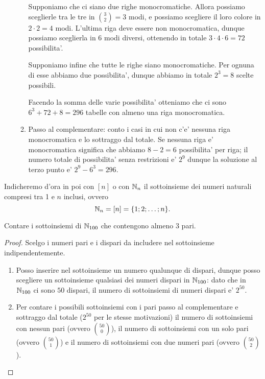 \begin{solution}
\begin{enumerate}
\begin{enumerate}[1.]
            Supponiamo che ci siano due righe monocromatiche. Allora possiamo sceglierle tra le tre in $\binom{3}{2} = 3$ modi, e possiamo scegliere il loro colore in $2\cdot2 = 4$ modi. L'ultima riga deve essere non monocromatica, dunque possiamo sceglierla in $6$ modi diversi, ottenendo in totale $3 \cdot 4 \cdot 6 = 72$ possibilita'.

            Supponiamo infine che tutte le righe siano monocromatiche. Per ognuna di esse abbiamo due possibilita', dunque abbiamo in totale $2^3 = 8$ scelte possibili.

            Facendo la somma delle varie possibilita' otteniamo che ci sono $6^3 + 72 + 8 = 296$ tabelle con almeno una riga monocromatica.
            \item Passo al complementare: conto i casi in cui non c'e' nessuna riga monocromatica e lo sottraggo dal totale. Se nessuna riga e' monocromatica significa che abbiamo $8 - 2 = 6$ possibilita' per riga; il numero totale di possibilita' senza restrizioni e' $2^9$ dunque la soluzione al terzo punto e' $2^9 - 6^3 = 296$.
        \end{enumerate}
    \end{enumerate}
\end{solution}

\begin{definition}
    Indicheremo d'ora in poi con $[n]$ o con $\mathbb{N}_n$ il sottoinsieme dei numeri naturali compresi tra 1 e $n$ inclusi, ovvero \begin{equation}
        \mathbb{N}_{n} = [n] = \{1; 2; \dots; n\}.
    \end{equation}
\end{definition}

\begin{example}
    Contare i sottoinsiemi di $\mathbb{N}_{100}$ che contengono almeno $3$ pari.
\end{example}
\begin{proof}
    Scelgo i numeri pari e i dispari da includere nel sottoinsieme indipendentemente.
    \begin{enumerate}
        \item Posso inserire nel sottoinsieme un numero qualunque di dispari, dunque posso scegliere un sottoinsieme qualsiasi dei numeri dispari in $\mathbb{N}_{100}$: dato che in $\mathbb{N}_{100}$ ci sono $50$ dispari, il numero di sottoinsiemi di numeri dispari e' $2^50$.
        \item Per contare i possibili sottoinsiemi con i pari passo al complementare e sottraggo dal totale ($2^50$ per le stesse motivazioni) il numero di sottoinsiemi con nessun pari (ovvero $\binom{50}{0}$), il numero di sottoinsiemi con un solo pari (ovvero $\binom{50}{1}$) e il numero di sottoinsiemi con due numeri pari (ovvero $\binom{50}{2}$).
    \end{enumerate}
\end{proof}

